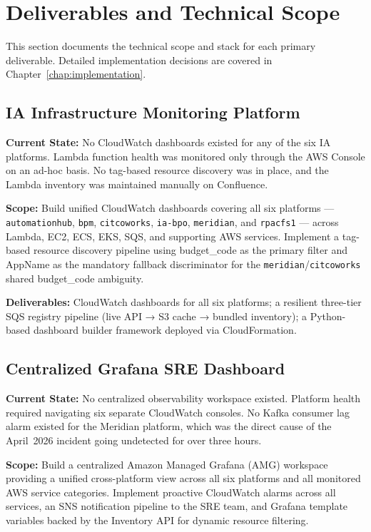 \FloatBarrier

\section{Deliverables and Technical Scope}
\label{sec:deliverables_scope}


This section documents the technical scope and stack for each primary
deliverable. Detailed implementation decisions are covered in
Chapter~\ref{chap:implementation}.


\subsection{IA Infrastructure Monitoring Platform}

\textbf{Current State:} 
No CloudWatch dashboards existed for any of the six
IA platforms. Lambda function health was monitored only through the AWS
Console on an ad-hoc basis. No tag-based resource discovery was in place,
and the Lambda inventory was maintained manually on Confluence.

\textbf{Scope:} 
Build unified CloudWatch dashboards covering all six
platforms --- \texttt{automationhub}, \texttt{bpm}, \texttt{citcoworks},
\texttt{ia-bpo}, \texttt{meridian}, and \texttt{rpacfs1} --- across Lambda,
EC2, ECS, EKS, SQS, and supporting AWS services. Implement a tag-based
resource discovery pipeline using budget\_code as the primary filter and
AppName as the mandatory fallback discriminator for the
\texttt{meridian}/\texttt{citcoworks} shared budget\_code ambiguity.

\textbf{Deliverables:} 
CloudWatch dashboards for all six platforms; a
resilient three-tier SQS registry pipeline (live API → S3 cache → bundled
inventory); a Python-based dashboard builder framework deployed via
CloudFormation.


\subsection{Centralized Grafana SRE Dashboard}

\textbf{Current State:} 
No centralized observability workspace existed.
Platform health required navigating six separate CloudWatch consoles.
No Kafka consumer lag alarm existed for the Meridian platform, which was
the direct cause of the April~2026 incident going undetected for over
three hours.

\textbf{Scope:} 
Build a centralized Amazon Managed Grafana (AMG) workspace
providing a unified cross-platform view across all six platforms and all
monitored AWS service categories. Implement proactive CloudWatch alarms
across all services, an SNS notification pipeline to the SRE team, and
Grafana template variables backed by the Inventory API for dynamic
resource filtering.

